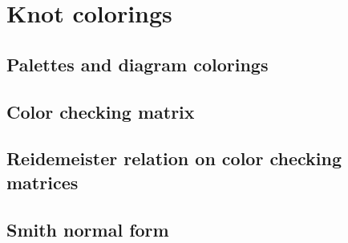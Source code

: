 \section{Knot colorings}\label{sec3}

\subsection{Palettes and diagram colorings}



\subsection{Color checking matrix}
\label{section 3.2}



\subsection{Reidemeister relation on color checking matrices}



\subsection{Smith normal form}



%
% 
%
%
%
% 
%
%
% 
%
%
%
%  
%
%
%  
